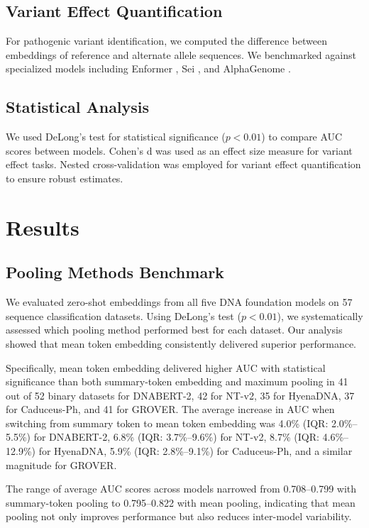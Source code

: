 \documentclass{article}
\begin{document}
\subsection{Variant Effect Quantification}

For pathogenic variant identification, we computed the difference between embeddings of reference and alternate allele sequences. We benchmarked against specialized models including Enformer \citep{avsec2021effective}, Sei \citep{chen2022sei}, and AlphaGenome \citep{alphagenome2024}.

\subsection{Statistical Analysis}

We used DeLong's test for statistical significance ($p < 0.01$) to compare AUC scores between models. Cohen's d was used as an effect size measure for variant effect tasks. Nested cross-validation was employed for variant effect quantification to ensure robust estimates.

\section{Results}

\subsection{Pooling Methods Benchmark}

We evaluated zero-shot embeddings from all five DNA foundation models on 57 sequence classification datasets. Using DeLong's test ($p < 0.01$), we systematically assessed which pooling method performed best for each dataset. Our analysis showed that mean token embedding consistently delivered superior performance.

Specifically, mean token embedding delivered higher AUC with statistical significance than both summary-token embedding and maximum pooling in 41 out of 52 binary datasets for DNABERT-2, 42 for NT-v2, 35 for HyenaDNA, 37 for Caduceus-Ph, and 41 for GROVER. The average increase in AUC when switching from summary token to mean token embedding was 4.0\% (IQR: 2.0\%--5.5\%) for DNABERT-2, 6.8\% (IQR: 3.7\%--9.6\%) for NT-v2, 8.7\% (IQR: 4.6\%--12.9\%) for HyenaDNA, 5.9\% (IQR: 2.8\%--9.1\%) for Caduceus-Ph, and a similar magnitude for GROVER.

The range of average AUC scores across models narrowed from 0.708--0.799 with summary-token pooling to 0.795--0.822 with mean pooling, indicating that mean pooling not only improves performance but also reduces inter-model variability.
\end{document}
